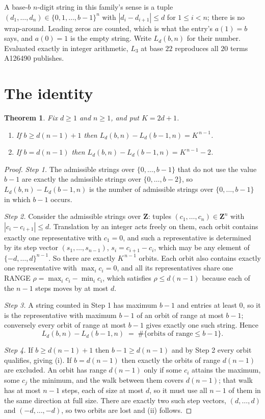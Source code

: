 \documentclass[11pt,a4paper]{article}
\theoremstyle{plain}
\newtheorem{theorem}{Theorem}
\theoremstyle{definition}
\begin{document}
A base-$b$ $n$-digit string in this family's sense is a tuple
$(d_1,\dots,d_n)\in\{0,1,\dots,b-1\}^{n}$ with $|d_i-d_{i+1}|\le d$ for $1\le i<n$; there
is no wrap-around. Leading zeros are counted, which is what the entry's $a(1)=b$ says, and
$a(0)=1$ is the empty string. Write $L_d(b,n)$ for their number. Evaluated exactly in integer
arithmetic, $L_{3}$ at base $22$ reproduces all $20$ terms A126490 publishes.

\section{The identity}

\begin{theorem}
Fix $d\ge1$ and $n\ge1$, and put $K=2d+1$.
\begin{enumerate}
\item[(i)] If $b\ge d(n-1)+1$ then $L_d(b,n)-L_d(b-1,n)=K^{\,n-1}$.
\item[(ii)] If $b=d(n-1)$ then $L_d(b,n)-L_d(b-1,n)=K^{\,n-1}-2$.
\end{enumerate}
\end{theorem}

\begin{proof}
\emph{Step 1.} The admissible strings over $\{0,\dots,b-1\}$ that do not use the value $b-1$
are exactly the admissible strings over $\{0,\dots,b-2\}$, so $L_d(b,n)-L_d(b-1,n)$ is the
number of admissible strings over $\{0,\dots,b-1\}$ in which $b-1$ occurs.

\emph{Step 2.} Consider the admissible strings over $\mathbf{Z}$: tuples
$(c_1,\dots,c_n)\in\mathbf{Z}^{n}$ with $|c_i-c_{i+1}|\le d$. Translation by an integer acts
freely on them, each orbit contains exactly one representative with $c_1=0$, and such a
representative is determined by its step vector $(s_1,\dots,s_{n-1})$, $s_i=c_{i+1}-c_i$,
which may be any element of $\{-d,\dots,d\}^{n-1}$. So there are exactly $K^{\,n-1}$ orbits.
Each orbit also contains exactly one representative with $\max_i c_i=0$, and all its
representatives share one RANGE $\rho=\max_ic_i-\min_ic_i$, which satisfies
$\rho\le d(n-1)$ because each of the $n-1$ steps moves by at most $d$.

\emph{Step 3.} A string counted in Step 1 has maximum $b-1$ and entries at least $0$, so it is
the representative with maximum $b-1$ of an orbit of range at most $b-1$; conversely every orbit
of range at most $b-1$ gives exactly one such string. Hence
\[
L_d(b,n)-L_d(b-1,n)\;=\;\#\{\text{orbits of range}\le b-1\} .
\]

\emph{Step 4.} If $b\ge d(n-1)+1$ then $b-1\ge d(n-1)$ and by Step 2 every orbit qualifies,
giving (i). If $b=d(n-1)$ then exactly the orbits of range $d(n-1)$ are excluded. An orbit has
range $d(n-1)$ only if some $c_i$ attains the maximum, some $c_j$ the minimum, and the walk
between them covers $d(n-1)$; that walk has at most $n-1$ steps, each of size at most $d$, so it
must use all $n-1$ of them in the same direction at full size. There are exactly two such step
vectors, $(d,\dots,d)$ and $(-d,\dots,-d)$, so two orbits are lost and (ii) follows.
\end{proof}
\end{document}
